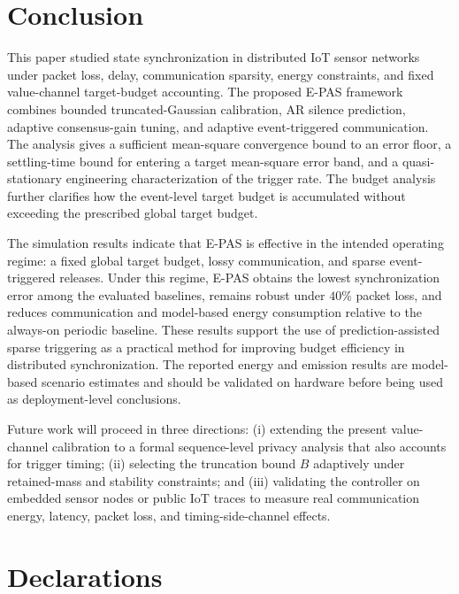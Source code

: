 \documentclass[10pt]{article}
\newcommand{\EPAS}{E-PAS}
\newcommand{\AR}{AR}
\begin{document}

\section{Conclusion}\label{sec:conclusion}

This paper studied state synchronization in distributed IoT sensor networks under packet loss, delay, communication sparsity, energy constraints, and fixed value-channel target-budget accounting. The proposed \EPAS{} framework combines bounded truncated-Gaussian calibration, \AR{} silence prediction, adaptive consensus-gain tuning, and adaptive event-triggered communication. The analysis gives a sufficient mean-square convergence bound to an error floor, a settling-time bound for entering a target mean-square error band, and a quasi-stationary engineering characterization of the trigger rate. The budget analysis further clarifies how the event-level target budget is accumulated without exceeding the prescribed global target budget.

The simulation results indicate that \EPAS{} is effective in the intended operating regime: a fixed global target budget, lossy communication, and sparse event-triggered releases. Under this regime, \EPAS{} obtains the lowest synchronization error among the evaluated baselines, remains robust under $40\%$ packet loss, and reduces communication and model-based energy consumption relative to the always-on periodic baseline. These results support the use of prediction-assisted sparse triggering as a practical method for improving budget efficiency in distributed synchronization. The reported energy and emission results are model-based scenario estimates and should be validated on hardware before being used as deployment-level conclusions.

Future work will proceed in three directions: (i) extending the present value-channel calibration to a formal sequence-level privacy analysis that also accounts for trigger timing; (ii) selecting the truncation bound $B$ adaptively under retained-mass and stability constraints; and (iii) validating the controller on embedded sensor nodes or public IoT traces to measure real communication energy, latency, packet loss, and timing-side-channel effects.


\section*{Declarations}
\end{document}
